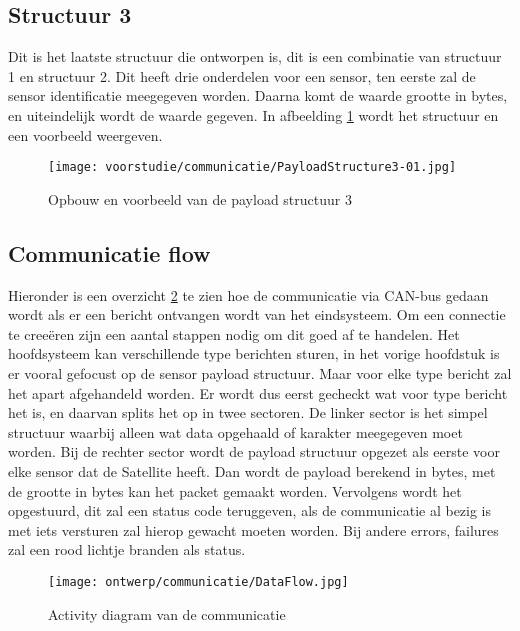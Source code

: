 \subsection{Structuur 3}
Dit is het laatste structuur die ontworpen is, dit is een combinatie van structuur 1 en structuur 2. Dit heeft drie onderdelen voor een sensor, ten eerste zal de sensor identificatie meegegeven worden. Daarna komt de waarde grootte in bytes, en uiteindelijk wordt de waarde gegeven. In afbeelding \ref{fig:Structure3} wordt het structuur en een voorbeeld weergeven.
\begin{figure}[h!]
	\label{fig:Structure3}

	\texttt{[image: voorstudie/communicatie/PayloadStructure3-01.jpg]}
	\caption{Opbouw en voorbeeld van de payload structuur 3}
\end{figure}

\newpage
\subsection{Communicatie flow}
Hieronder is een overzicht \ref{fig:comflow} te zien hoe de communicatie via CAN-bus gedaan wordt als er een bericht ontvangen wordt van het eindsysteem. Om een connectie te creeëren zijn een aantal stappen nodig om dit goed af te handelen. Het hoofdsysteem kan verschillende type berichten sturen, in het vorige hoofdstuk is er vooral gefocust op de sensor payload structuur. Maar voor elke type bericht zal het apart afgehandeld worden. Er wordt dus eerst gecheckt wat voor type bericht het is, en daarvan splits het op in twee sectoren. De linker sector is het simpel structuur waarbij alleen wat data opgehaald of karakter meegegeven moet worden. Bij de rechter sector wordt de payload structuur opgezet als eerste voor elke sensor dat de Satellite heeft. Dan wordt de payload berekend in bytes, met de grootte in bytes kan het packet gemaakt worden. Vervolgens wordt het opgestuurd, dit zal een status code teruggeven, als de communicatie al bezig is met iets versturen zal hierop gewacht moeten worden. Bij andere errors, failures zal een rood lichtje branden als status.
\begin{figure}[h!]
	\centering
	\label{fig:comflow}

	\texttt{[image: ontwerp/communicatie/DataFlow.jpg]}
	\caption{Activity diagram van de communicatie}
\end{figure}

\newpage
